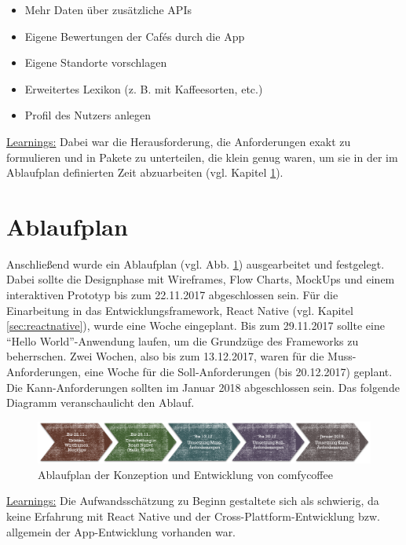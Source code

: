 \begin{itemize}
	\item Mehr Daten über zusätzliche APIs
	\item Eigene Bewertungen der Cafés durch die App
	\item Eigene Standorte vorschlagen
	\item Erweitertes Lexikon (z. B. mit Kaffeesorten, etc.)
	\item Profil des Nutzers anlegen
\end{itemize}

\underline{Learnings:}
Dabei war die Herausforderung, die Anforderungen exakt zu formulieren und in Pakete zu unterteilen, die klein genug waren, um sie in der im Ablaufplan definierten Zeit abzuarbeiten (vgl. Kapitel \ref{sec:ablaufplan}).

\section{Ablaufplan}
\label{sec:ablaufplan}
Anschließend wurde ein Ablaufplan (vgl. Abb. \ref{fig:ablaufplan}) ausgearbeitet und festgelegt. Dabei sollte die Designphase mit Wireframes, Flow Charts, MockUps und einem interaktiven Prototyp bis zum 22.11.2017 abgeschlossen sein. Für die Einarbeitung in das Entwicklungsframework, React Native (vgl. Kapitel \ref{sec:reactnative}), wurde eine Woche eingeplant. Bis zum 29.11.2017 sollte eine ``Hello World''-Anwendung laufen, um die Grundzüge des Frameworks zu beherrschen. Zwei Wochen, also bis zum 13.12.2017, waren für die Muss-Anforderungen, eine Woche für die Soll-Anforderungen (bis 20.12.2017) geplant. Die Kann-Anforderungen sollten im Januar 2018 abgeschlossen sein. Das folgende Diagramm veranschaulicht den Ablauf.

\begin{figure}[h!]
    \centering
		\includegraphics[width=\textwidth]{Bilder/ablaufplan.png}
		\caption{Ablaufplan der Konzeption und Entwicklung von comfycoffee}
		\label{fig:ablaufplan}
\end{figure}

\underline{Learnings:}
Die Aufwandsschätzung zu Beginn gestaltete sich als schwierig, da keine Erfahrung mit React Native und der Cross-Plattform-Entwicklung bzw. allgemein der App-Entwicklung vorhanden war.

